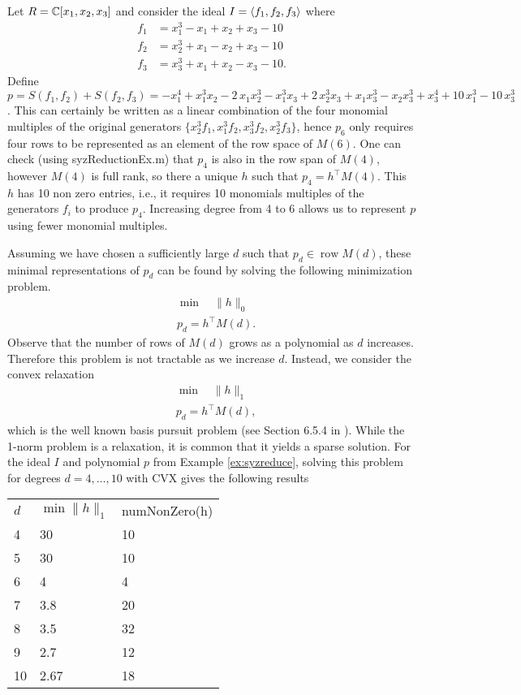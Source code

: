 \documentclass[10pt,letterpaper,oneside]{amsart}
\DeclareMathOperator{\row}{row}
\begin{document}
\begin{example}
\label{ex:syzreduce}
Let $R = \mathbb{C}[x_1,x_2,x_3]$ and consider the ideal $I = \langle f_1,f_2,f_3\rangle $ where
\begin{align*}
f_1 &= {x}_{1}^{3}-{x}_{1}+{x}_{2}+{x}_{3}-10\\
f_2 &= {x}_{2}^{3}+{x}_{1}-{x}_{2}+{x}_{3}-10\\
f_3 &= {x}_{3}^{3}+{x}_{1}+{x}_{2}-{x}_{3}-10.
\end{align*}
Define $p = S(f_1, f_2) + S(f_2,f_3) = -{x}_{1}^{4}+{x}_{1}^{3}{x}_{2}-2\,{x}_{1}{x}_{2}^{3}-{x}_{1}^{3}{x}_{3
      }+2\,{x}_{2}^{3}{x}_{3}+{x}_{1}{x}_{3}^{3}-{x}_{2}{x}_{3}^{3}+{x}_{3}^{4
      }+10\,{x}_{1}^{3}-10\,{x}_{3}^{3}$. This can certainly be written as a linear combination of the four monomial multiples of the original generators $\{x_2^3 f_1, x_1^3 f_2, x_3^3 f_2, x_2^3 f_3\}$, hence $p_6$ only requires four rows to be represented as an element of the row space of $M(6)$. One can check (using syzReductionEx.m) that $p_4$ is also in the row span of $M(4)$, however $M(4)$ is full rank, so there a unique $h$ such that $p_4 = h^\top M(4)$. This $h$ has 10 non zero entries, i.e., it requires 10 monomials multiples of the generators $f_i$ to produce $p_4$. Increasing degree from 4 to 6 allows us to represent $p$ using fewer monomial multiples. 
\end{example}
Assuming we have chosen a sufficiently large $d$ such that $p_d \in \row M(d)$, these minimal representations of $p_d$ can be found by solving the following minimization problem.
\begin{align}
    &\min \quad \|h\|_0 \\
         &p_d = h^\top M(d). 
\end{align}
Observe that the number of rows of $M(d)$ grows as a polynomial as $d$ increases. Therefore this problem is not tractable as we increase $d$. Instead, we consider the convex relaxation 
\begin{align}
    &\min \quad\|h\|_1 \\
         &p_d = h^\top M(d),
\end{align}
which is the well known basis pursuit problem (see Section 6.5.4 in \cite{boyd2004convex}). While the 1-norm problem is a relaxation, it is common that it yields a sparse solution. For the ideal $I$ and polynomial $p$ from Example \ref{ex:syzreduce}, solving this problem for degrees $d = 4, \dots, 10$ with CVX gives the following results
\begin{table}[]
\begin{tabular}{lll}
$d$ & $\min\|h\|_1$ & numNonZero(h)  \\
4     & 30   & 10 \\
5     & 30   & 10 \\
6     & 4    & 4  \\
7     & 3.8  & 20 \\
8     & 3.5  & 32 \\
9     & 2.7  & 12 \\
10    & 2.67 & 18
\end{tabular}
\end{table}
\end{document}
